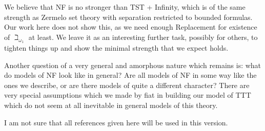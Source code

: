 \documentclass[112pt]{article}
\begin{document}
We believe that NF is no stronger than TST + Infinity, which is of the same strength as Zermelo set theory with separation restricted to bounded formulas.  Our work here does not show this, as we need enough Replacement for
existence of $\beth_{\omega_1}$ at least.  We leave it as an interesting further task, possibly for others, to tighten things up and show the minimal strength that we expect holds.

Another question of a very general and amorphous nature which remains is:  what do models of NF look like in general?  Are all models of NF in some way like the ones we describe, or are there models of quite a different character?  There are very special assumptions which we made by fiat in building our model of TTT which do  not seem at all inevitable in general models of this theory.

\newpage

I am not sure that all references given here will be used in this version.
\end{document}
